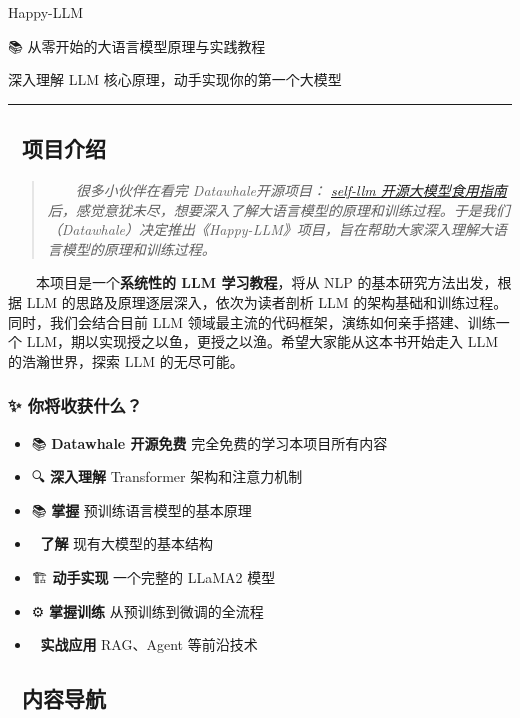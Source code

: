 \documentclass[
]{article}
\author{}
\date{}
\providecommand{\tightlist}{%
  \setlength{\itemsep}{0pt}\setlength{\parskip}{0pt}}
\begin{document}
{
\setcounter{tocdepth}{3}
\tableofcontents
}
Happy-LLM

📚 从零开始的大语言模型原理与实践教程

深入理解 LLM 核心原理，动手实现你的第一个大模型

\begin{center}\rule{0.5\linewidth}{0.5pt}\end{center}

\subsection{🎯 项目介绍}\label{ux9879ux76eeux4ecbux7ecd}

\begin{quote}
  \emph{很多小伙伴在看完 Datawhale开源项目：
\href{https://github.com/datawhalechina/self-llm}{self-llm
开源大模型食用指南}
后，感觉意犹未尽，想要深入了解大语言模型的原理和训练过程。于是我们（Datawhale）决定推出《Happy-LLM》项目，旨在帮助大家深入理解大语言模型的原理和训练过程。}
\end{quote}

  本项目是一个\textbf{系统性的 LLM 学习教程}，将从 NLP
的基本研究方法出发，根据 LLM 的思路及原理逐层深入，依次为读者剖析 LLM
的架构基础和训练过程。同时，我们会结合目前 LLM
领域最主流的代码框架，演练如何亲手搭建、训练一个
LLM，期以实现授之以鱼，更授之以渔。希望大家能从这本书开始走入 LLM
的浩瀚世界，探索 LLM 的无尽可能。

\subsubsection{✨
你将收获什么？}\label{ux4f60ux5c06ux6536ux83b7ux4ec0ux4e48}

\begin{itemize}
\tightlist
\item
  📚 \textbf{Datawhale 开源免费} 完全免费的学习本项目所有内容
\item
  🔍 \textbf{深入理解} Transformer 架构和注意力机制
\item
  📚 \textbf{掌握} 预训练语言模型的基本原理
\item
  🧠 \textbf{了解} 现有大模型的基本结构
\item
  🏗️ \textbf{动手实现} 一个完整的 LLaMA2 模型
\item
  ⚙️ \textbf{掌握训练} 从预训练到微调的全流程
\item
  🚀 \textbf{实战应用} RAG、Agent 等前沿技术
\end{itemize}

\subsection{📖 内容导航}\label{ux5185ux5bb9ux5bfcux822a}
\end{document}

